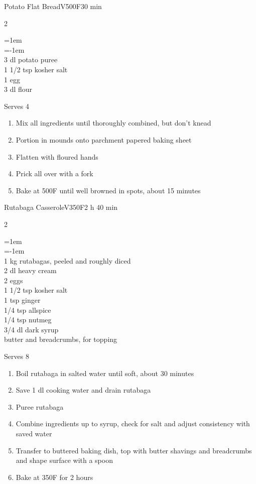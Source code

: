 \documentclass{article}
\newenvironment{recipe}[3][]
    {\begin{cardbase}[#1]{#2}{#3}
    \columnratio{0.333}
    \begin{paracol}{2}}
    {\end{paracol}\end{cardbase}}
\newenvironment{denserecipe}[3][]
    {\small
    \begin{recipe}[#1]{#2}{#3}}
    {\end{recipe}}
\newcommand{\nextcolumn}{\switchcolumn}
\newenvironment{ingredients}
    {
    \begin{obeylines}
    \vspace{\parskip}
    \setlength{\parskip}{0.25em}
    \vspace{-0.25em}
    \leftskip=1em
    \parindent=-1em}
    {\end{obeylines}}
\newenvironment{steps}
    {\begin{enumerate}[leftmargin=*,topsep=0pt]}
    {\end{enumerate}}
\newcommand{\fahrenheit}[1]{#1\textdegree{}F}
\newcommand{\tag}[1]{\hspace{1em}#1}
\newcommand{\symboltag}[2]{\tag{#1\hspace{0.4em}#2}}
\newcommand{\totaltime}[1]{\symboltag{\raisebox{-0.1em}{\small\StopWatchEnd}}{#1}}
\newcommand{\preheat}[1]{\symboltag{\Topbottomheat}{#1}}
\begin{document}
\begin{recipe}{Potato Flat Bread}{\tag{V}\preheat{\fahrenheit{500}}\totaltime{30 min}}
\begin{ingredients}
3 dl potato puree
1 1/2 tsp kosher salt
1 egg
3 dl flour
\end{ingredients}
\nextcolumn
Serves 4
\begin{steps}
    \item Mix all ingredients until thoroughly combined, but don't knead
    \item Portion in mounds onto parchment papered baking sheet
    \item Flatten with floured hands
    \item Prick all over with a fork
    \item Bake at \fahrenheit{500} until well browned in spots, about 15 minutes
\end{steps}
\end{recipe}

\begin{denserecipe}{Rutabaga Casserole}{\tag{V}\preheat{\fahrenheit{350}}\totaltime{2 h 40 min}}
\begin{ingredients}
1 kg rutabagas, peeled and roughly diced
2 dl heavy cream
2 eggs
1 1/2 tsp kosher salt
1 tsp ginger
1/4 tsp allspice
1/4 tsp nutmeg
3/4 dl dark syrup
butter and breadcrumbs, for topping
\end{ingredients}
\nextcolumn
Serves 8
\begin{steps}
    \item Boil rutabaga in salted water until soft, about 30 minutes
    \item Save 1 dl cooking water and drain rutabaga
    \item Puree rutabaga
    \item Combine ingredients up to syrup, check for salt and adjust consistency with saved water
    \item Transfer to buttered baking dish, top with butter shavings and breadcrumbs and shape surface with a spoon
    \item Bake at \fahrenheit{350} for 2 hours
\end{steps}
\end{denserecipe}
\end{document}
